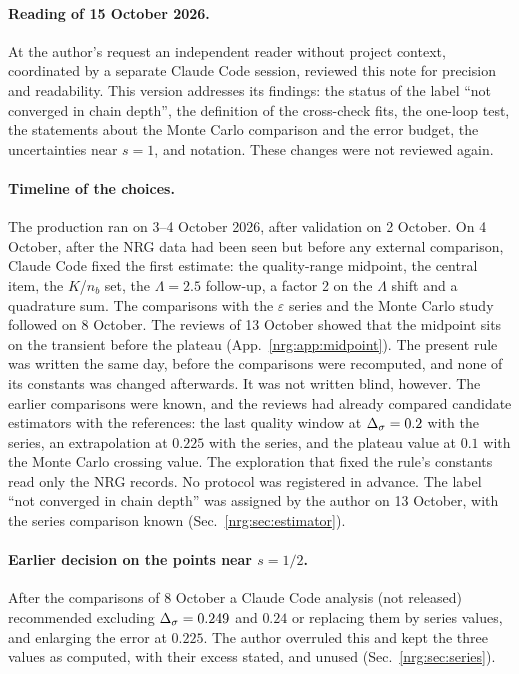 \paragraph{Reading of 15 October 2026.} At the author's request an independent reader without project context, coordinated by a
separate Claude Code session, reviewed this note for precision and readability. This version addresses its findings: the status of
the label ``not converged in chain depth'', the definition of the cross-check fits, the one-loop test, the statements about the
Monte Carlo comparison and the error budget, the uncertainties near $s=1$, and notation. These changes were not reviewed again.

\paragraph{Timeline of the choices.} The production ran on 3--4 October 2026, after validation on 2 October. On 4 October, after the
NRG data had been seen but before any external comparison, Claude Code fixed the first estimate: the quality-range midpoint, the
central item, the $K$/$n_b$ set, the $\Lambda=2.5$ follow-up, a factor 2 on the $\Lambda$ shift and a quadrature sum. The comparisons
with the $\varepsilon$ series and the Monte Carlo study followed on 8 October. The reviews of 13 October showed that the midpoint sits
on the transient before the plateau (App.~\ref{nrg:app:midpoint}). The present rule was written the same day, before the comparisons were
recomputed, and none of its constants was changed afterwards. It was not written blind, however. The earlier comparisons were known,
and the reviews had already compared candidate estimators with the references: the last quality window at $\Delta_\sigma=0.2$ with the series,
an extrapolation at $0.225$ with the series, and the plateau value at $0.1$ with the Monte Carlo crossing value. The exploration that
fixed the rule's constants read only the NRG records. No protocol was registered in advance. The label ``not converged in chain depth''
was assigned by the author on 13 October, with the series comparison known (Sec.~\ref{nrg:sec:estimator}).

\paragraph{Earlier decision on the points near $s=1/2$.} After the comparisons of 8 October a Claude Code analysis (not released)
recommended excluding $\Delta_\sigma=0.249$ and $0.24$ or replacing them by series values, and enlarging the error at $0.225$. The author
overruled this and kept the three values as computed, with their excess stated, and unused (Sec.~\ref{nrg:sec:series}).

